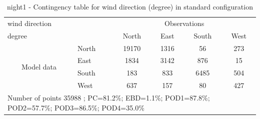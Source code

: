 \begin{table}[p!]
\begin{center}
\begin{tabular}{llcccc}
\hline
{wind direction}                                       &                             &    \multicolumn{4}{c}{Observations}                 \\
{degree}                                       &                             & {North}   & {East} & {South} & {West} \\
\hline
\multicolumn{1}{c}{\multirow{4}{*}{Model data}}  & {North}                    & 19170   & 1316    & 56     & 273\\
                                                 & {East}                     & 1834   & 3142    & 876     & 15\\
                                                 & {South}                    & 183   & 833   & 6485    & 504\\
                                                 & {West}                     & 637  & 157   & 80    & 427\\
\hline 
\multicolumn{6}{l}{ Number of points        35988 ; PC=81.2\%; EBD=1.1\%; POD1=87.8\%; POD2=57.7\%; POD3=86.5\%; POD4=35.0\%}                 \\
\end{tabular}
\end{center}
\caption{night1 - Contingency table for {wind direction} (degree) in standard configuration}
\label{tab:contingencywdBEF:night1}
\end{table}
